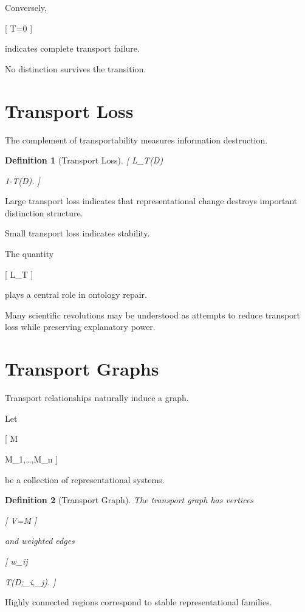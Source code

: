\documentclass[11pt,oneside,openany]{book}
\newtheorem{definition}{Definition}[chapter] \newtheorem{theorem}{Theorem}[chapter] \newtheorem{proposition}{Proposition}[chapter] \newtheorem{lemma}{Lemma}[chapter] \newtheorem{corollary}{Corollary}[chapter] \newtheorem{remark}{Remark}[chapter]
\begin{document}
Conversely,

[
T=0
]

indicates complete transport failure.

No distinction survives the transition.

\section{Transport Loss}

The complement of transportability measures information destruction.

\begin{definition}[Transport Loss]

[
L_T(D)

1-T(D).
]

\end{definition}

Large transport loss indicates that representational change destroys important distinction structure.

Small transport loss indicates stability.

The quantity

[
L_T
]

plays a central role in ontology repair.

Many scientific revolutions may be understood as attempts to reduce transport loss while preserving explanatory power.

\section{Transport Graphs}

Transport relationships naturally induce a graph.

Let

[
\mathcal M

{M_1,\ldots,M_n}
]

be a collection of representational systems.

\begin{definition}[Transport Graph]

The transport graph has vertices

[
V=\mathcal M
]

and weighted edges

[
w_{ij}

T(D;\pi_i,\pi_j).
]

\end{definition}

Highly connected regions correspond to stable representational families.
\end{document}
